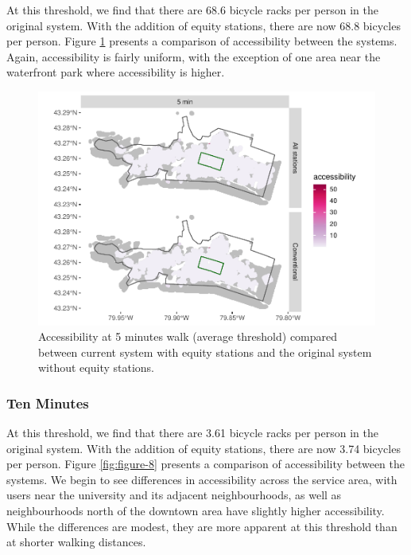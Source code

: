\documentclass[]{elsarticle} %
\begin{document}
At this threshold, we find that there are 68.6 bicycle racks per person
in the original system. With the addition of equity stations, there are
now 68.8 bicycles per person. Figure \ref{fig:figure-7} presents a
comparison of accessibility between the systems. Again, accessibility is
fairly uniform, with the exception of one area near the waterfront park
where accessibility is higher.

\begin{figure}

{\centering \includegraphics[width=0.65\linewidth]{Bike-share-spatial-equity_files/figure-latex/figure-7-1} 

}

\caption{Accessibility at 5 minutes walk (average threshold) compared between current system with equity stations and the original system without equity stations.}\label{fig:figure-7}
\end{figure}

\hypertarget{ten-minutes}{%
\subsubsection{Ten Minutes}\label{ten-minutes}}

At this threshold, we find that there are 3.61 bicycle racks per person
in the original system. With the addition of equity stations, there are
now 3.74 bicycles per person. Figure \ref{fig:figure-8} presents a
comparison of accessibility between the systems. We begin to see
differences in accessibility across the service area, with users near
the university and its adjacent neighbourhoods, as well as
neighbourhoods north of the downtown area have slightly higher
accessibility. While the differences are modest, they are more apparent
at this threshold than at shorter walking distances.
\end{document}
